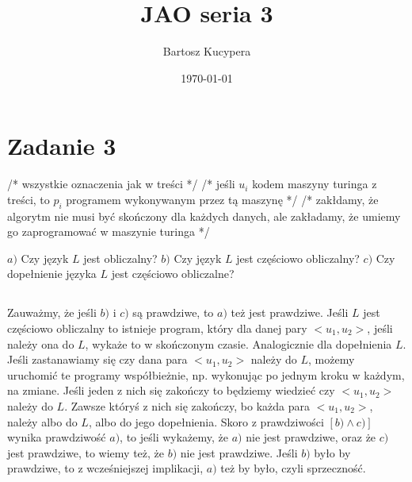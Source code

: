 \documentclass{article}
\title{JAO seria 3}
\author{Bartosz Kucypera}
\date{\today}
\begin{document}
\maketitle

\section*{Zadanie 3}

/* wszystkie oznaczenia jak w treści */ \newline
/* jeśli $u_i$ kodem maszyny turinga z treści, to $p_i$ programem wykonywanym przez tą maszynę */ \newline
/* zakłdamy, że algorytm nie musi być skończony dla każdych danych, \newline
ale zakładamy, że umiemy go zaprogramować w maszynie turinga */

$a)$ Czy język $L$ jest obliczalny? \newline
$b)$ Czy język $L$ jest częściowo obliczalny? \newline
$c)$ Czy dopełnienie języka $L$ jest częściowo obliczalne? 

\subsection*{}
Zauważmy, że jeśli $b)$ i $c)$ są prawdziwe, to $a)$ też jest prawdziwe. \newline
Jeśli $L$ jest częściowo obliczalny to istnieje program, który dla danej pary $<u_1,u_2>$,
jeśli należy ona do $L$, wykaże to w skończonym czasie. Analogicznie dla dopełnienia $L$.\newline
Jeśli zastanawiamy się czy dana para $<u_1, u_2>$ należy do $L$, możemy uruchomić te programy współbieżnie, np. wykonując po jednym kroku w każdym, na zmiane. Jeśli jeden z nich się zakończy to będziemy wiedzieć czy $<u_1,u_2>$ należy do $L$. Zawsze któryś z nich się zakończy, bo każda para $<u_1, u_2>$, należy albo do $L$, albo do jego dopełnienia. \newline
\newline 
Skoro z prawdziwości $[b) \land c)]$ wynika prawdziwość $a)$, to jeśli wykażemy, że $a)$ nie jest prawdziwe, oraz że $c)$ jest prawdziwe, to wiemy też, że $b)$ nie jest prawdziwe. Jeśli $b)$ było by prawdziwe, to z wcześniejszej implikacji, $a)$ też by było, czyli sprzeczność.
\end{document}
